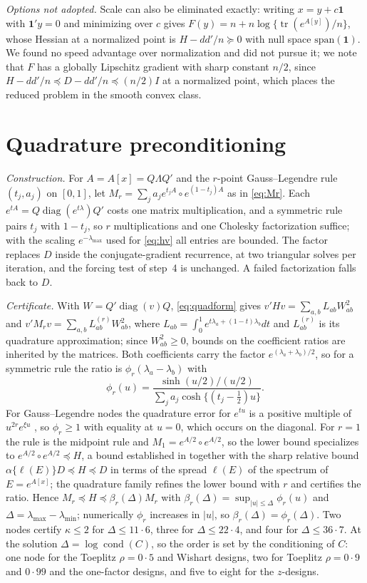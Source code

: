 \documentclass[11pt]{article}
\newcommand{\tr}{\operatorname{tr}}
\newcommand{\diag}{\operatorname{diag}}
\newcommand{\one}{\mathbf{1}}
\begin{document}
\emph{Options not adopted.} Scale can also be eliminated exactly:
writing $x=y+c\one$ with $\one'y=0$ and minimizing over $c$ gives
$F(y)=n+n\log\{\tr(e^{A[y]})/n\}$, whose Hessian at a normalized point
is $H-dd'/n\succeq0$ with null space $\mathrm{span}(\one)$. We found
no speed advantage over normalization and did not pursue it; we note
that $F$ has a globally Lipschitz gradient with sharp constant $n/2$,
since $H-dd'/n\preceq D-dd'/n\preceq(n/2)I$ at a normalized point,
which places the reduced problem in the smooth convex class.

\section{Quadrature preconditioning}\label{sec:quad}

\emph{Construction.} For $A=A[x]=Q\Lambda Q'$ and the $r$-point
Gauss--Legendre rule $(t_j,a_j)$ on $[0,1]$, let
$M_r=\sum_ja_je^{t_jA}\circ e^{(1-t_j)A}$ as in \eqref{eq:Mr}. Each
$e^{tA}=Q\diag(e^{t\lambda})Q'$ costs one matrix multiplication, and a
symmetric rule pairs $t_j$ with $1-t_j$, so $r$ multiplications and
one Cholesky factorization suffice; with the scaling $e^{-\lambda_{\max}}$
used for \eqref{eq:hv} all entries are bounded. The factor replaces
$D$ inside the conjugate-gradient recurrence, at two triangular solves
per iteration, and the forcing test of step~4 is unchanged. A failed
factorization falls back to $D$.

\emph{Certificate.} With $W=Q'\diag(v)Q$, \eqref{eq:quadform} gives
$v'Hv=\sum_{a,b}L_{ab}W_{ab}^{2}$ and
$v'M_rv=\sum_{a,b}L^{(r)}_{ab}W_{ab}^{2}$, where
$L_{ab}=\int_0^1e^{t\lambda_a+(1-t)\lambda_b}dt$ and $L^{(r)}_{ab}$ is
its quadrature approximation; since $W_{ab}^{2}\geq0$, bounds on the
coefficient ratios are inherited by the matrices. Both coefficients
carry the factor $e^{(\lambda_a+\lambda_b)/2}$, so for a symmetric rule
the ratio is $\phi_r(\lambda_a-\lambda_b)$ with
\[
\phi_r(u)=\frac{\sinh(u/2)/(u/2)}{\sum_ja_j\cosh\{(t_j-\tfrac12)u\}} .
\]
For Gauss--Legendre nodes the quadrature error for $e^{tu}$ is a
positive multiple of $u^{2r}e^{\xi u}$ \citep{DavisRabinowitz:1984},
so $\phi_r\geq1$ with equality at $u=0$, which occurs on the diagonal.
For $r=1$ the rule is the midpoint rule and $M_1=e^{A/2}\circ e^{A/2}$,
so the lower bound specializes to $e^{A/2}\circ e^{A/2}\preceq H$, a
bound established in \citet{ArchakovHansen:Legendre} together with
the sharp relative bound $\alpha\{\ell(E)\}D\preceq H\preceq D$ in
terms of the spread $\ell(E)$ of the spectrum of $E=e^{A[x]}$; the
quadrature family refines the lower bound with $r$ and certifies the
ratio.
Hence $M_r\preceq H\preceq\beta_r(\Delta)M_r$ with
$\beta_r(\Delta)=\sup_{|u|\leq\Delta}\phi_r(u)$ and
$\Delta=\lambda_{\max}-\lambda_{\min}$; numerically $\phi_r$ increases
in $|u|$, so $\beta_r(\Delta)=\phi_r(\Delta)$. Two nodes certify
$\kappa\leq2$ for $\Delta\leq11{\cdot}6$, three for
$\Delta\leq22{\cdot}4$, and four for $\Delta\leq36{\cdot}7$. At the
solution $\Delta=\log\operatorname{cond}(C)$, so the order is set by
the conditioning of $C$: one node for the Toeplitz $\rho=0{\cdot}5$ and
Wishart designs, two for Toeplitz $\rho=0{\cdot}9$ and $0{\cdot}99$
and the one-factor designs, and five to eight for the $z$-designs.
\end{document}
